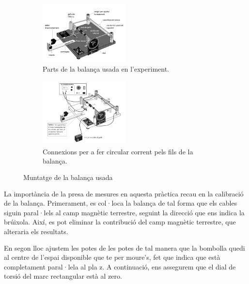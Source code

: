 \documentclass[11pt]{article}
\numberwithin{equation}{section}
\numberwithin{figure}{section}
\numberwithin{table}{section}
\begin{document}
\begin{figure}[H]
    \centering
    \begin{subfigure}{0.4\textwidth}
        \centering
        \includegraphics[width=0.5\textwidth]{PR2_dib_muntatge_parts.jpg}
        \caption{Parts de la balança usada en l'experiment.}
        \label{fig: PR2_dib_muntatge_parts}
    \end{subfigure}
    \hspace{0.1\textwidth}
    \begin{subfigure}{0.4\textwidth}
        \centering
        \includegraphics[width=0.5\textwidth]{PR2_dib_muntatge_corrent.jpg}
        \caption{Connexions per a fer circular corrent pels fils de la balança.}
        \label{fig: PR2_dib_muntatge_corrent}
    \end{subfigure}
\caption{Muntatge de la balança usada}
\end{figure}

La importància de la presa de mesures en aquesta pràctica recau en la calibració de la balança. Primerament, es col·loca la balança de tal forma que els cables siguin paral·lels al camp magnètic terrestre, seguint la direcció que ens indica la brúixola. Així, es pot eliminar la contribució del camp
magnètic terrestre, que alteraria els resultats. 

En segon lloc ajustem les potes de les potes de tal manera que la bombolla quedi al centre de l'espai disponible que te per moure's, fet que indica que està completament paral·lela al pla z. A continuació, ens assegurem que el dial de torsió del marc rectangular està al zero. 
\end{document}
